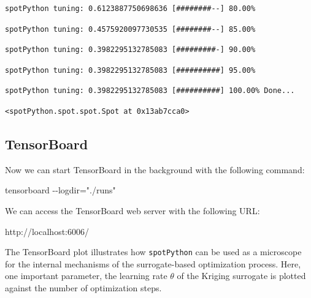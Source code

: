 \documentclass[
  letterpaper,
  DIV=11,
  numbers=noendperiod]{scrreprt}
\newenvironment{Shaded}{\begin{snugshade}}{\end{snugshade}}
\newcommand{\NormalTok}[1]{\textcolor[rgb]{0.00,0.23,0.31}{#1}}
\begin{document}
\begin{verbatim}
spotPython tuning: 0.6123887750698636 [########--] 80.00% 
\end{verbatim}

\begin{verbatim}
spotPython tuning: 0.4575920097730535 [########--] 85.00% 
\end{verbatim}

\begin{verbatim}
spotPython tuning: 0.3982295132785083 [#########-] 90.00% 
\end{verbatim}

\begin{verbatim}
spotPython tuning: 0.3982295132785083 [##########] 95.00% 
\end{verbatim}

\begin{verbatim}
spotPython tuning: 0.3982295132785083 [##########] 100.00% Done...
\end{verbatim}

\begin{verbatim}
<spotPython.spot.spot.Spot at 0x13ab7cca0>
\end{verbatim}

\hypertarget{tensorboard-5}{%
\subsection{TensorBoard}\label{tensorboard-5}}

Now we can start TensorBoard in the background with the following
command:

\begin{Shaded}
\begin{Highlighting}[]
\NormalTok{tensorboard {-}{-}logdir="./runs"}
\end{Highlighting}
\end{Shaded}

We can access the TensorBoard web server with the following URL:

\begin{Shaded}
\begin{Highlighting}[]
\NormalTok{http://localhost:6006/}
\end{Highlighting}
\end{Shaded}

The TensorBoard plot illustrates how \texttt{spotPython} can be used as
a microscope for the internal mechanisms of the surrogate-based
optimization process. Here, one important parameter, the learning rate
\(\theta\) of the Kriging surrogate is plotted against the number of
optimization steps.
\end{document}
